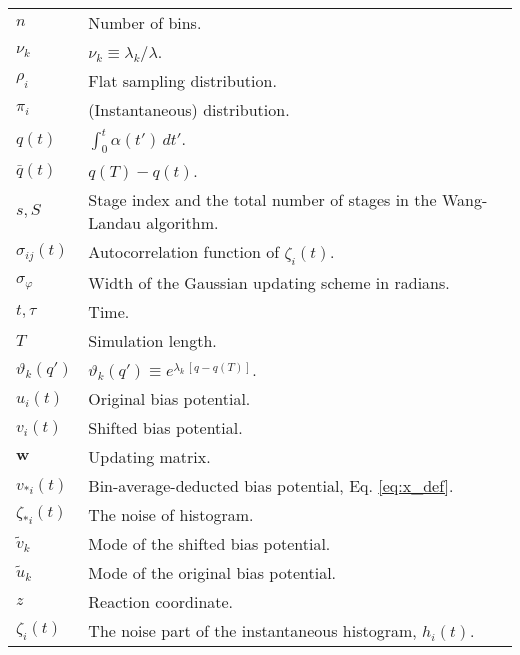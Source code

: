 \documentclass[reprint, superscriptaddress, floatfix]{revtex4-1}
\begin{document}
{\begin{table*}
\begin{tabular}{l | p{12cm} }
    $n$             &   Number of bins. \\
    $\nu_k$         &   $\nu_k \equiv \lambda_k / \lambda$. \\
    $\rho_i$        &   Flat sampling distribution. \\
    $\pi_i$         &   (Instantaneous) distribution. \\
    $q(t)$          &   $\int_0^t \alpha(t') \, dt'$.  \\
    $\bar q(t)$     &   $q(T) - q(t)$.  \\
    $s, S$          &   Stage index and the total number of stages in the Wang-Landau algorithm. \\
    $\sigma_{ij}(t)$   &   Autocorrelation function of $\zeta_i(t)$. \\
    $\sigma_\varphi$   &   Width of the Gaussian updating scheme in radians. \\
    $t, \tau$       &   Time. \\
    $T$             &   Simulation length. \\
    $\vartheta_k(q')$       &   $\vartheta_k(q') \equiv e^{\lambda_k \, [q - q(T)]}$. \\
    $u_i(t)$        &   Original bias potential. \\
    $v_i(t)$        &   Shifted bias potential. \\
    $\mathbf w$     &   Updating matrix. \\
    $v_{*i}(t)$     &   Bin-average-deducted bias potential, Eq. \eqref{eq:x_def}. \\
    $\zeta_{*i}(t)$ &   The noise of histogram. \\
    ${\tilde v}_k$  &   Mode of the shifted bias potential. \\
    ${\tilde u}_k$  &   Mode of the original bias potential. \\
    $z$             &   Reaction coordinate. \\
    $\zeta_i(t)$    &   The noise part of the instantaneous histogram, $h_i(t)$.
  \end{tabular}
  \end{table*}
}


\end{document}
